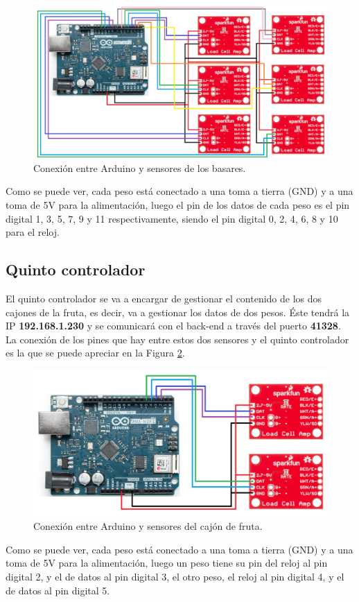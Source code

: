 \begin{figure}[h] 
    \centering
    \includegraphics[width=.60\textwidth]{capitulos/capitulo6/ard4.jpg}
    \caption{Conexión entre Arduino y sensores de los basares.}
    \label{fig:ard4}
\end{figure}

Como se puede ver, cada peso está conectado a una toma a tierra (GND) y a una toma de 5V para la alimentación, luego el pin de los datos de cada peso es el pin digital 1, 3, 5, 7, 9 y 11 respectivamente, siendo el pin digital 0, 2, 4, 6, 8 y 10 para el reloj.

\subsection{Quinto controlador}

El quinto controlador se va a encargar de gestionar el contenido de los dos cajones de la fruta, es decir, va a gestionar los datos de dos pesos. Éste tendrá la IP \textbf{192.168.1.230} y se comunicará con el back-end a través del puerto \textbf{41328}. La conexión de los pines que hay entre estos dos sensores y el quinto controlador es la que se puede apreciar en la Figura \ref{fig:ard5}.

\begin{figure}[h] 
    \centering
    \includegraphics[width=.60\textwidth]{capitulos/capitulo6/ard2.png}
    \caption{Conexión entre Arduino y sensores del cajón de fruta.}
    \label{fig:ard5}
\end{figure}

Como se puede ver, cada peso está conectado a una toma a tierra (GND) y a una toma de 5V para la alimentación, luego un peso tiene su pin del reloj al pin digital 2, y el de datos al pin digital 3, el otro peso, el reloj al pin digital 4, y el de datos al pin digital 5.

